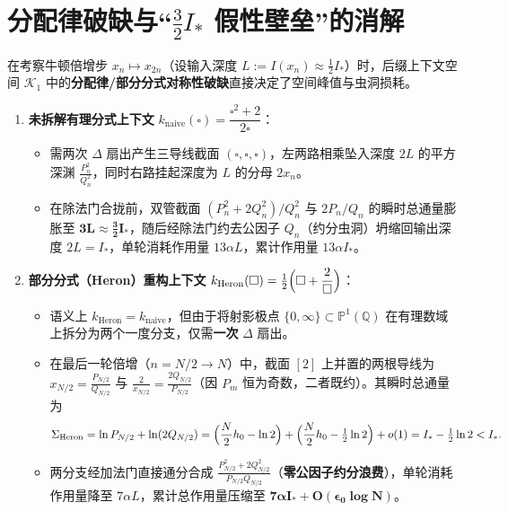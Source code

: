\documentclass[11pt,a4paper]{ctexart}
\theoremstyle{plain}
\theoremstyle{definition}
\newcommand{\PP}{\mathbb{P}}
\newcommand{\QQ}{\mathbb{Q}}
\newcommand{\cK}{\mathcal{K}}
\begin{document}
\section{分配律破缺与“$\tfrac{3}{2}I_*$ 假性壁垒”的消解}

在考察牛顿倍增步 $x_n \mapsto x_{2n}$（设输入深度 $L := I(x_n) \approx \frac{1}{2} I_*$）时，后缀上下文空间 $\cK_1$ 中的\textbf{分配律/部分分式对称性破缺}直接决定了空间峰值与虫洞损耗。

\begin{enumerate}
\item \textbf{未拆解有理分式上下文} $k_{\mathrm{naive}}(\square) = \dfrac{\square^2 + 2}{2\square}$：
\begin{itemize}
\item 需两次 $\Delta$ 扇出产生三导线截面 $(\square, \square, \square)$，左两路相乘坠入深度 $2L$ 的平方深渊 $\frac{P_n^2}{Q_n^2}$，同时右路挂起深度为 $L$ 的分母 $2x_n$。
\item 在除法门合拢前，双管截面 $(P_n^2 + 2Q_n^2)/Q_n^2$ 与 $2P_n/Q_n$ 的瞬时总通量膨胀至 $\bm{3L \approx \frac{3}{2} I_*}$，随后经除法门约去公因子 $Q_n$（约分虫洞）坍缩回输出深度 $2L = I_*$，单轮消耗作用量 $13\alpha L$，累计作用量 $13\alpha I_*$。
\end{itemize}

\item \textbf{部分分式（Heron）重构上下文} $k_{\mathrm{Heron}}(\square) = \frac{1}{2}\Bigl(\square + \dfrac{2}{\square}\Bigr)$：
\begin{itemize}
\item 语义上 $k_{\mathrm{Heron}} = k_{\mathrm{naive}}$，但由于将射影极点 $\{0, \infty\} \subset \PP^1(\QQ)$ 在有理数域上拆分为两个一度分支，仅需\textbf{一次} $\Delta$ 扇出。
\item 在最后一轮倍增（$n = N/2 \to N$）中，截面 $[2]$ 上并置的两根导线为 $x_{N/2} = \frac{P_{N/2}}{Q_{N/2}}$ 与 $\frac{2}{x_{N/2}} = \frac{2 Q_{N/2}}{P_{N/2}}$（因 $P_m$ 恒为奇数，二者既约）。其瞬时总通量为
\[
\Sigma_{\mathrm{Heron}} = \ln P_{N/2} + \ln(2 Q_{N/2})
= \Bigl(\frac{N}{2}h_0 - \ln 2\Bigr) + \Bigl(\frac{N}{2}h_0 - \tfrac{1}{2}\ln 2\Bigr) + o(1)
= I_* - \tfrac{1}{2}\ln 2 < I_*.
\]
\item 两分支经加法门直接通分合成 $\frac{P_{N/2}^2 + 2Q_{N/2}^2}{P_{N/2} Q_{N/2}}$（\textbf{零公因子约分浪费}），单轮消耗作用量降至 $7\alpha L$，累计总作用量压缩至 $\bm{7\alpha I_* + O(\epsilon_0 \log N)}$。
\end{itemize}
\end{enumerate}
\end{document}
